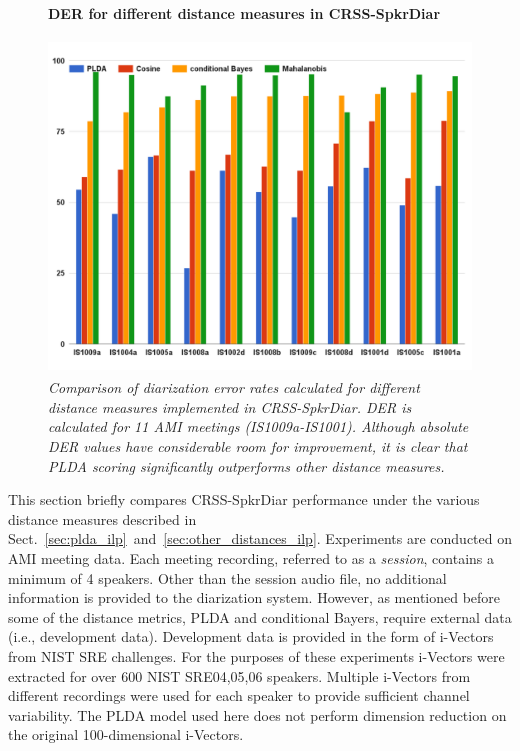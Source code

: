 \begin{figure}[b!]
	\vspace{2mm}
	\centering
	\textbf{DER for different distance measures in CRSS-SpkrDiar}\par\medskip
	\includegraphics[height = 3.5in, width=1\textwidth]{figures/crssdiar_distances_der}
	\caption{\it \small Comparison of diarization error rates calculated for different distance measures implemented in CRSS-SpkrDiar. DER is calculated for 11 AMI meetings (IS1009a-IS1001). Although absolute DER values have considerable room for improvement, it is clear that PLDA scoring significantly outperforms other distance measures.}
	\label{fig:compare_crssdiar_distances}
\end{figure}

This section briefly compares CRSS-SpkrDiar performance under the various distance measures described in Sect.~\ref{sec:plda_ilp}~and~\ref{sec:other_distances_ilp}. 
Experiments are conducted on AMI meeting data. 
Each meeting recording, referred to as a {\it session}, contains a minimum of 4 speakers. 
Other than the session audio file, no additional information is provided to the diarization system. 
However, as mentioned before some of the distance metrics, PLDA and conditional Bayers, require external data (i.e., development data). 
Development data is provided in the form of i-Vectors from NIST SRE challenges. 
For the purposes of these experiments i-Vectors were extracted for over 600 NIST SRE04,05,06 speakers. 
Multiple i-Vectors from different recordings were used for each speaker to provide sufficient channel variability. 
The PLDA model used here does not perform dimension reduction on the original 100-dimensional i-Vectors. 

